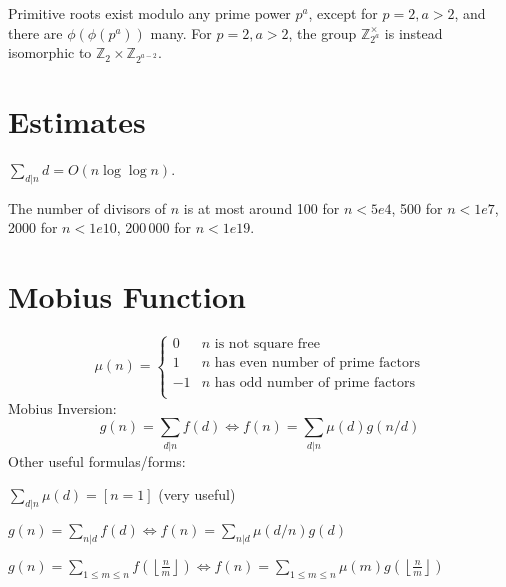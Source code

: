 	Primitive roots exist modulo any prime power $p^a$, except for $p = 2, a > 2$, and there are $\phi(\phi(p^a))$ many.
	For $p = 2, a > 2$, the group $\mathbb Z_{2^a}^\times$ is instead isomorphic to $\mathbb Z_2 \times \mathbb Z_{2^{a-2}}$.

\section{Estimates}
	$\sum_{d|n} d = O(n \log \log n)$.

	The number of divisors of $n$ is at most around 100 for $n < 5e4$, 500 for $n < 1e7$, 2000 for $n < 1e10$, 200\,000 for $n < 1e19$.

\section{Mobius Function}
\[
	\mu(n) = \begin{cases} 0 & n \textrm{ is not square free}\\ 1 & n \textrm{ has even number of prime factors}\\ -1 & n \textrm{ has odd number of prime factors}\\\end{cases}
\]
  Mobius Inversion:
  \[ g(n) = \sum_{d|n} f(d) \Leftrightarrow f(n) = \sum_{d|n} \mu(d)g(n/d) \]
  Other useful formulas/forms:

  $ \sum_{d | n} \mu(d) = [ n = 1] $ (very useful)

  $ g(n) = \sum_{n|d} f(d) \Leftrightarrow f(n) = \sum_{n|d} \mu(d/n)g(d)$

 $ g(n) = \sum_{1 \leq m \leq n} f(\left\lfloor\frac{n}{m}\right \rfloor ) \Leftrightarrow f(n) = \sum_{1\leq m\leq n} \mu(m)g(\left\lfloor\frac{n}{m}\right\rfloor)$
